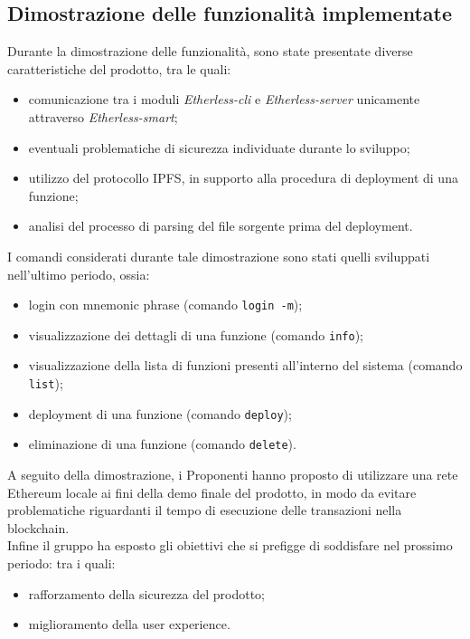 \subsection{Dimostrazione delle funzionalità implementate}
Durante la dimostrazione delle funzionalità, sono state presentate diverse caratteristiche del prodotto, tra le quali:
\begin{itemize}
	\item comunicazione tra i moduli \textit{Etherless-cli} e 	\textit{Etherless-server} unicamente attraverso \textit{Etherless-smart};
	\item eventuali problematiche di sicurezza individuate durante lo sviluppo;
	\item utilizzo del protocollo IPFS, in supporto alla procedura di deployment di una funzione;
	\item analisi del processo di parsing del file sorgente prima del deployment.
\end{itemize}
I comandi considerati durante tale dimostrazione sono stati quelli sviluppati nell'ultimo periodo, ossia:
\begin{itemize}
	\item login con mnemonic phrase (comando \texttt{login -m});
	\item visualizzazione dei dettagli di una funzione (comando \texttt{info});
	\item visualizzazione della lista di funzioni presenti all'interno del sistema (comando \texttt{list});
	\item deployment di una funzione (comando \texttt{deploy});
	\item eliminazione di una funzione (comando \texttt{delete}).
\end{itemize}
A seguito della dimostrazione, i Proponenti hanno proposto di utilizzare una rete Ethereum locale ai fini della demo finale del prodotto, in modo da evitare problematiche riguardanti il tempo di esecuzione delle transazioni nella blockchain. \\
Infine il gruppo ha esposto gli obiettivi che si prefigge di soddisfare nel prossimo periodo: tra i quali:
\begin{itemize}
	\item rafforzamento della sicurezza del prodotto;
	\item miglioramento della user experience.
\end{itemize}
